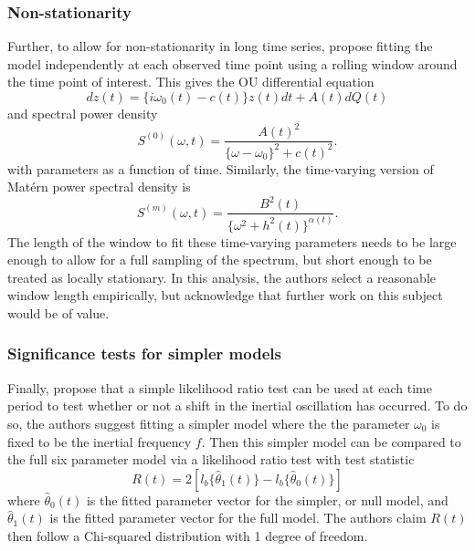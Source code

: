 \documentclass{stat572Style}
\begin{document}
\subsubsection{Non-stationarity}
Further, to allow for non-stationarity in long time series, \citep{Sykulski2016} propose fitting the model independently at each observed time point using a rolling window around the time point of interest. 
This gives the OU differential equation
\begin{equation}
dz(t) = \{i \omega_{0}(t) - c(t) \} z(t) dt + A(t) dQ(t)
\end{equation}
and spectral power density
\begin{equation}
S^{(0)}(\omega, t) = \frac{A(t)^{2}}{\{\omega - \omega_{0}\}^{2} + c(t)^{2}}. 
\end{equation}
with parameters as a function of time. 
Similarly, the time-varying version of Mat\'{e}rn power spectral density is 
\begin{equation}
S^{(m)}(\omega, t) = \frac{B^{2}(t)}{\{\omega^{2} + h^{2}(t)\}^{\alpha(t)}}.
\end{equation}
The length of the window to fit these time-varying parameters needs to be large enough to allow for a full sampling of the spectrum, but short enough to be treated as locally stationary. 
 In this analysis, the authors select a reasonable window length empirically, but acknowledge that further work on this subject would be of value.  

\subsubsection{Significance tests for simpler models}
Finally, \citet{Sykulski2016} propose that a simple likelihood ratio test can be used at each time period to test whether or not a shift in the inertial oscillation has occurred. 
To do so, the authors suggest fitting a simpler model where the the parameter $\omega_{0}$ is fixed to be the inertial frequency $f$. 
Then this simpler model can be compared to the full six parameter model via a likelihood ratio test with test statistic
\begin{equation}
\label{eq: LRT}
R(t) = 2[l_{b} \{\hat{\theta}_{1}(t) \} - l_{b}\{\hat{\theta}_{0}(t) \} ]
\end{equation}
where $\hat{\theta}_{0}(t)$ is the fitted parameter vector for the simpler, or null model, and $\hat{\theta}_{1}(t)$ is the fitted parameter vector for the full model.
 The authors claim $R(t)$ then follow a Chi-squared distribution with 1 degree of freedom.
\end{document}
